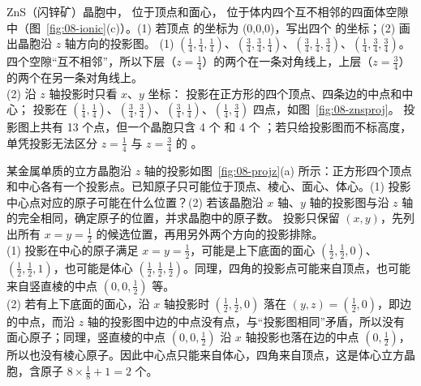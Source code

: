 \begin{liti}[典型·原子分数坐标与投影图]
ZnS（闪锌矿）晶胞中， 位于顶点和面心， 位于体内四个互不相邻的四面体空隙中（图~\ref{fig:08-ionic}(c)）。(1) 若顶点  的坐标为 (0,0,0)，写出四个  的坐标；(2) 画出晶胞沿 $z$ 轴方向的投影图。
\tcblower
\jie (1) $(\frac14,\frac14,\frac14)$、$(\frac34,\frac34,\frac14)$、$(\frac34,\frac14,\frac34)$、$(\frac14,\frac34,\frac34)$。四个空隙“互不相邻”，所以下层（$z=\frac14$）的两个在一条对角线上，上层（$z=\frac34$）的两个在另一条对角线上。\\
(2) 沿 $z$ 轴投影时只看 $x$、$y$ 坐标： 投影在正方形的四个顶点、四条边的中点和中心； 投影在 $(\frac14,\frac14)$、$(\frac34,\frac34)$、$(\frac34,\frac14)$、$(\frac14,\frac34)$ 四点，如图~\ref{fig:08-znsproj}。
\dianbo 投影图上共有 13 个点，但一个晶胞只含 4 个  和 4 个 ；若只给投影图而不标高度，单凭投影无法区分 $z=\frac14$ 与 $z=\frac34$ 的 。
\end{liti}

\begin{liti}
某金属单质的立方晶胞沿 $z$ 轴的投影如图~\ref{fig:08-projz}(a) 所示：正方形四个顶点和中心各有一个投影点。已知原子只可能位于顶点、棱心、面心、体心。(1) 投影中心点对应的原子可能在什么位置？(2) 若该晶胞沿 $x$ 轴、$y$ 轴的投影图与沿 $z$ 轴的完全相同，确定原子的位置，并求晶胞中的原子数。
\tcblower
\silu 投影只保留 $(x,y)$，先列出所有 $x=y=\frac12$ 的候选位置，再用另外两个方向的投影排除。\\
\jie (1) 投影在中心的原子满足 $x=y=\frac12$，可能是上下底面的面心 $(\frac12,\frac12,0)$、$(\frac12,\frac12,1)$，也可能是体心 $(\frac12,\frac12,\frac12)$。同理，四角的投影点可能来自顶点，也可能来自竖直棱的中点 $(0,0,\frac12)$ 等。\\
(2) 若有上下底面的面心，沿 $x$ 轴投影时 $(\frac12,\frac12,0)$ 落在 $(y,z)=(\frac12,0)$，即边的中点，而沿 $z$ 轴的投影图中边的中点没有点，与“投影图相同”矛盾，所以没有面心原子；同理，竖直棱的中点 $(0,0,\frac12)$ 沿 $x$ 轴投影也落在边的中点 $(0,\frac12)$，所以也没有棱心原子。因此中心点只能来自体心，四角来自顶点，这是体心立方晶胞，含原子 $8\times\frac18+1=2$ 个。
\end{liti}

